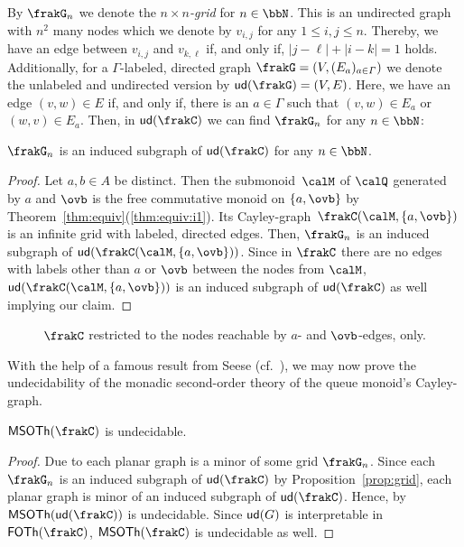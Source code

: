 By $\frakG_n$ we denote the \emph{$n\times n$-grid} for $n\in\bbN$. This is an undirected graph with $n^2$ many nodes which we denote by $v_{i,j}$ for any $1\leq i,j\leq n$. Thereby, we have an edge between $v_{i,j}$ and $v_{k,\ell}$ if, and only if, $|j-\ell|+|i-k|=1$ holds.
Additionally, for a $\varGamma$-labeled, directed graph $\frakG=(V,(E_a)_{a\in\varGamma})$ we denote the unlabeled and undirected version by $\ud{\frakG}=(V,E)$. Here, we have an edge $(v,w)\in E$ if, and only if, there is an $a\in\varGamma$ such that $(v,w)\in E_a$ or $(w,v)\in E_a$. Then, in $\ud{\cQ}$ we can find $\frakG_n$ for any $n\in\bbN$:

\begin{proposition}\label{prop:grid}
	$\frakG_n$ is an induced subgraph of $\ud{\cQ}$ for any $n\in\bbN$.
\end{proposition}
\begin{proof}
	Let $a,b\in A$ be distinct. Then the submonoid~$\calM$ of $\Qx$ generated by $a$ and $\ovb$ is the free commutative monoid on $\{a,\ovb\}$ by Theorem~\ref{thm:equiv}(\ref{thm:equiv:i1}). Its Cayley-graph~$\cayley{\calM}{\{a,\ovb\}}$ is an infinite grid with labeled, directed edges. %
	Then, $\frakG_n$ is an induced subgraph of $\ud{\cayley{\calM}{\{a,\ovb\}}}$. Since in $\cQ$ there are no edges with labels other than $a$ or $\ovb$ between the nodes from $\calM$, $\ud{\cayley{\calM}{\{a,\ovb\}}}$ is an induced subgraph of $\ud{\cQ}$ as well implying our claim.
\end{proof}

\begin{figure}
	\begin{center}
		
	\end{center}
	\caption{$\cQ$ restricted to the nodes reachable by $a$- and $\ovb$-edges, only.}\label{fig:grid}
\end{figure}

With the help of a famous result from Seese (cf.~\cite{See91}), we may now prove the undecidability of the monadic second-order theory of the queue monoid's Cayley-graph.

\begin{corollary}
	$\MSOTh{\cQ}$ is undecidable.
\end{corollary}
\begin{proof}
	Due to \cite{RobS84} each planar graph is a minor of some grid $\frakG_n$. Since each $\frakG_n$ is an induced subgraph of $\ud{\cQ}$ by Proposition~\ref{prop:grid}, each planar graph is minor of an induced subgraph of $\ud{\cQ}$. Hence, by \cite[Theorem~5]{See91} $\MSOTh{\ud{\cQ}}$ is undecidable. Since $\mathsf{ud}(G)$ is interpretable in $\FOTh{\cQ}$, $\MSOTh{\cQ}$ is undecidable as well.
\end{proof}
